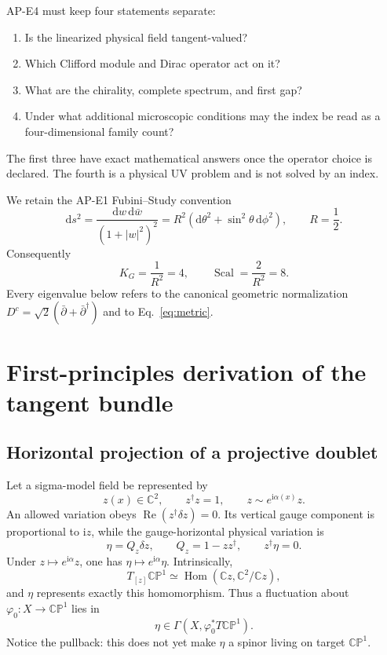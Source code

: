 \documentclass[11pt]{article}
\theoremstyle{definition}
\theoremstyle{remark}
\newcommand{\ii}{\mathrm i}
\newcommand{\dd}{\mathrm d}
\newcommand{\CC}{\mathbb C}
\newcommand{\CP}{\mathbb {CP}}
\begin{document}
AP-E4 must keep four statements separate:
\begin{enumerate}[label=(Q\arabic*)]
\item Is the linearized physical field tangent-valued?
\item Which Clifford module and Dirac operator act on it?
\item What are the chirality, complete spectrum, and first gap?
\item Under what additional microscopic conditions may the index be read as
  a four-dimensional family count?
\end{enumerate}
The first three have exact mathematical answers once the operator choice is
declared.  The fourth is a physical UV problem and is not solved by an index.

We retain the AP-E1 Fubini--Study convention
\begin{equation}
 \dd s^2=\frac{\dd w\,\dd\bar w}{(1+|w|^2)^2}
 =R^2(\dd\theta^2+\sin^2\theta\,\dd\phi^2),
 \qquad R=\frac12.
 \label{eq:metric}
\end{equation}
Consequently
\begin{equation}
 K_G=\frac1{R^2}=4,
 \qquad \operatorname{Scal}=\frac2{R^2}=8.
 \label{eq:curvatures}
\end{equation}
Every eigenvalue below refers to the canonical geometric normalization
\(D^c=\sqrt2(\bar\partial+\bar\partial^\dagger)\) and to
Eq.~\eqref{eq:metric}.

\section{First-principles derivation of the tangent bundle}

\subsection{Horizontal projection of a projective doublet}

Let a sigma-model field be represented by
\begin{equation}
 z(x)\in\CC^2,\qquad z^\dagger z=1,\qquad
 z\sim e^{\ii\alpha(x)}z.
 \label{eq:projective-field}
\end{equation}
An allowed variation obeys
\(\operatorname{Re}(z^\dagger\delta z)=0\).  Its vertical gauge component is
proportional to \(\ii z\), while the gauge-horizontal physical variation is
\begin{equation}
 \eta=Q_z\delta z,
 \qquad Q_z=1-zz^\dagger,
 \qquad z^\dagger\eta=0.
 \label{eq:horizontal-variation}
\end{equation}
Under \(z\mapsto e^{\ii\alpha}z\), one has
\(\eta\mapsto e^{\ii\alpha}\eta\).  Intrinsically,
\begin{equation}
 T_{[z]}\CP^1\simeq\operatorname{Hom}(\CC z,\CC^2/\CC z),
 \label{eq:tangent-hom}
\end{equation}
and \(\eta\) represents exactly this homomorphism.  Thus a fluctuation about
\(\varphi_0:X\to\CP^1\) lies in
\begin{equation}
 \eta\in\Gamma(X,\varphi_0^*T\CP^1).
 \label{eq:pullback-tangent}
\end{equation}
Notice the pullback: this does not yet make \(\eta\) a spinor living on target
\(\CP^1\).
\end{document}
